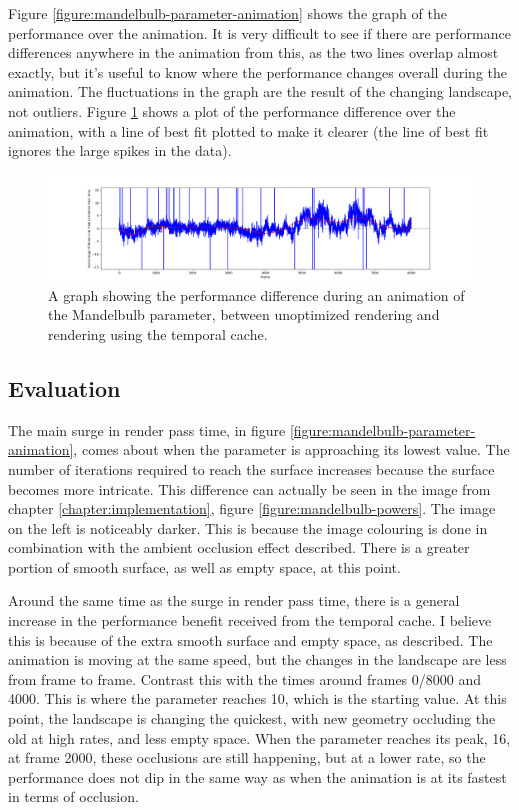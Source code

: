 Figure \ref{figure:mandelbulb-parameter-animation} shows the graph of the performance over the animation. It is very difficult to see if there are performance differences anywhere in the animation from this, as the two lines overlap almost exactly, but it's useful to know where the performance changes overall during the animation. The fluctuations in the graph are the result of the changing landscape, not outliers. Figure \ref{figure:mandelbulb-parameter-animation-gain} shows a plot of the performance difference over the animation, with a line of best fit plotted to make it clearer (the line of best fit ignores the large spikes in the data).

\begin{figure}[ht]
	\centering
	\includegraphics[width=\linewidth, frame]{Images/Results/Mandelbulb-Parameter-Animation-Gain.png}
	\caption{A graph showing the performance difference during an animation of the Mandelbulb parameter, between unoptimized rendering and rendering using the temporal cache.}
	\label{figure:mandelbulb-parameter-animation-gain}
\end{figure}

\subsection{Evaluation}

The main surge in render pass time, in figure \ref{figure:mandelbulb-parameter-animation}, comes about when the parameter is approaching its lowest value. The number of iterations required to reach the surface increases because the surface becomes more intricate. This difference can actually be seen in the image from chapter \ref{chapter:implementation}, figure \ref{figure:mandelbulb-powers}. The image on the left is noticeably darker. This is because the image colouring is done in combination with the ambient occlusion effect described. There is a greater portion of smooth surface, as well as empty space, at this point.\newline

Around the same time as the surge in render pass time, there is a general increase in the performance benefit received from the temporal cache. I believe this is because of the extra smooth surface and empty space, as described. The animation is moving at the same speed, but the changes in the landscape are less from frame to frame. Contrast this with the times around frames 0/8000 and 4000. This is where the parameter reaches 10, which is the starting value. At this point, the landscape is changing the quickest, with new geometry occluding the old at high rates, and less empty space. When the parameter reaches its peak, 16, at frame 2000, these occlusions are still happening, but at a lower rate, so the performance does not dip in the same way as when the animation is at its fastest in terms of occlusion.\newline

